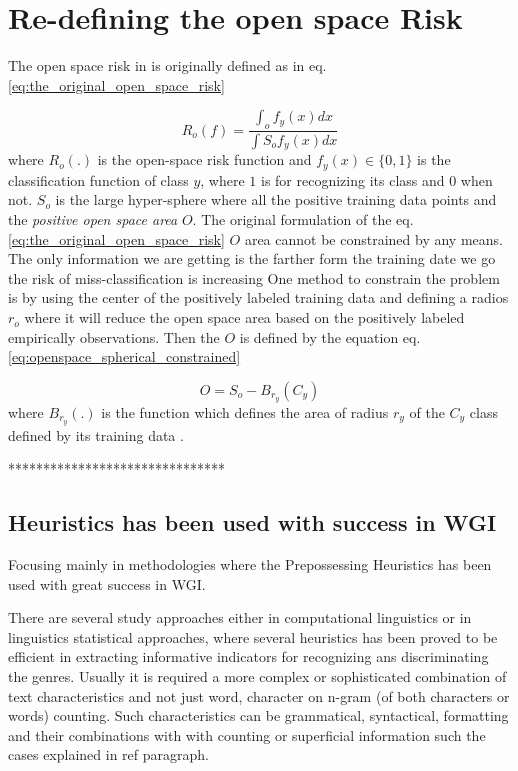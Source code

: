 \section{Re-defining the open space Risk }

The open space risk in \cite{scheirer2013toward} is originally defined as in eq. \ref{eq:the_original_open_space_risk}

\begin{equation}\label{eq:the_origina_open_space_risk}
	R_{o}(f) = \frac{\int_{o} f_{y}(x) dx}{\int{S_{o}}  f_{y}(x) dx}
\end{equation}
where $R_{o}(.)$ is the open-space risk function and $f_{y}(x)  \in \{0, 1\}$ is the classification function of class $y$, where $1$ is for recognizing its class and $0$ when not. $S_{o}$ is the large hyper-sphere where all the positive training data points and the \textit{positive open space area} $O$. 
The original formulation of the eq. \ref{eq:the_original_open_space_risk} $O$ area cannot be constrained by any means. The only information we are getting is the farther form the training date we go the risk of miss-classification is increasing One method to constrain the problem is by using the center of the positively labeled training data and defining a radios $r_{o}$ where it will reduce the open space area based on the positively labeled empirically observations. Then the $O$ is defined by the equation eq. \ref{eq:openspace_spherical_constrained}

\begin{equation}\label{eq:openspace_spherical_constrained}
	O = S_{o} - B_{r_{y}}(C_{y})
\end{equation}
where $B_{r_{y}}(.)$ is the function which defines the area of radius $r_{y}$ of the $C_{y}$ class defined by its training data \parencite{fei2016breaking}.

*******************************

\subsection{Heuristics has been used with success in WGI}\label{chap:relevant_work:sec:features:subsec:heuristics}
Focusing mainly in methodologies where the Prepossessing Heuristics has been used with great success in WGI.

There are several study approaches either in computational linguistics or in linguistics statistical approaches, where several heuristics has been proved to be efficient in extracting informative indicators for recognizing ans discriminating the genres. Usually it is required a more complex or sophisticated combination of text characteristics and not just word, character on n-gram (of both characters or words) counting. Such characteristics can be grammatical, syntactical, formatting and their combinations with  with counting or superficial information such the cases explained in ref{} paragraph.

